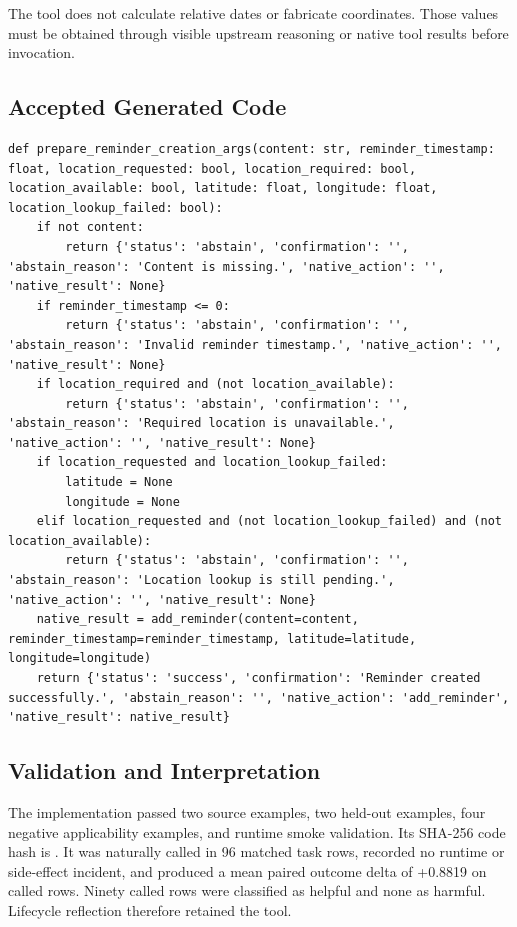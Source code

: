 The tool does not calculate relative dates or fabricate coordinates.
Those values must be obtained through visible upstream reasoning or
native tool results before invocation.

\subsection{Accepted Generated Code}\label{accepted-generated-code-1}

\begin{lstlisting}[style=sagepython,caption={Accepted reminder-creation native-action tool.},label={lst:sage-prepare-reminder-creation}]
def prepare_reminder_creation_args(content: str, reminder_timestamp: float, location_requested: bool, location_required: bool, location_available: bool, latitude: float, longitude: float, location_lookup_failed: bool):
    if not content:
        return {'status': 'abstain', 'confirmation': '', 'abstain_reason': 'Content is missing.', 'native_action': '', 'native_result': None}
    if reminder_timestamp <= 0:
        return {'status': 'abstain', 'confirmation': '', 'abstain_reason': 'Invalid reminder timestamp.', 'native_action': '', 'native_result': None}
    if location_required and (not location_available):
        return {'status': 'abstain', 'confirmation': '', 'abstain_reason': 'Required location is unavailable.', 'native_action': '', 'native_result': None}
    if location_requested and location_lookup_failed:
        latitude = None
        longitude = None
    elif location_requested and (not location_lookup_failed) and (not location_available):
        return {'status': 'abstain', 'confirmation': '', 'abstain_reason': 'Location lookup is still pending.', 'native_action': '', 'native_result': None}
    native_result = add_reminder(content=content, reminder_timestamp=reminder_timestamp, latitude=latitude, longitude=longitude)
    return {'status': 'success', 'confirmation': 'Reminder created successfully.', 'abstain_reason': '', 'native_action': 'add_reminder', 'native_result': native_result}
\end{lstlisting}

\subsection{Validation and
Interpretation}\label{validation-and-interpretation-1}

The implementation passed two source examples, two held-out examples,
four negative applicability examples, and runtime smoke validation. Its
SHA-256 code hash is
.
It was naturally called in 96 matched task rows, recorded no runtime or
side-effect incident, and produced a mean paired outcome delta of
+0.8819 on called rows. Ninety called rows were classified as helpful
and none as harmful. Lifecycle reflection therefore retained the tool.

